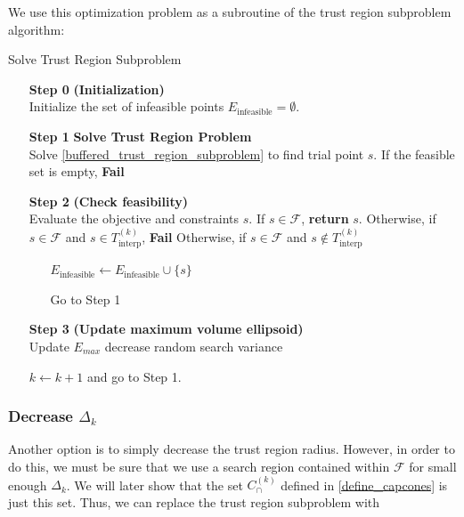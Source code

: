 \documentclass{article}
\theoremstyle{case}
\newcommand{\dk}{\Delta_k}
\newcommand{\sampletrk}{{T_{\text{interp}}^{(k)}}}
\newcommand{\feasible}{{\mathcal F}}
\newcommand{\trsinfset}{{E_\text{infeasible}}}
\newcommand{\capcones}{{C^{(k)}_{\cap}}}
\begin{document}
We use this optimization problem as a subroutine of the trust region subproblem algorithm:

\begin{algorithm}[H]
    \caption{Solve Trust Region Subproblem}
    \label{linear_cut_trust_region_subproblem}
    \begin{itemize}
        \item[\textbf{Step 0}] \textbf{(Initialization)} \\
	    Initialize the set of infeasible points $\trsinfset = \emptyset$.
        
        \item[\textbf{Step 1}] \textbf{Solve Trust Region Problem} \\
	    Solve \cref{buffered_trust_region_subproblem} to find trial point $s$.
	    If the feasible set is empty, \textbf{Fail}
        
        \item[\textbf{Step 2}] \textbf{(Check feasibility)} \\
            Evaluate the objective and constraints $s$.
            If $s\in\feasible$, \textbf{return} $s$.
            Otherwise, if $s\in\feasible$ and $s \in \sampletrk$, \textbf{Fail}
	    Otherwise, if $s\in\feasible$ and $s \not \in \sampletrk$ \begin{itemize}
	    	\item[] $\trsinfset \gets \trsinfset \cup \{s\}$
	    	\item[] Go to Step 1
	    \end{itemize}
            
        \item[\textbf{Step 3}] \textbf{(Update maximum volume ellipsoid)} \\
	    Update $E_{max}$
	    decrease random search variance
            
        $k \gets k+1$ and go to Step 1.
    \end{itemize}
\end{algorithm}




\subsubsection{Decrease $\dk$}

Another option is to simply decrease the trust region radius.
However, in order to do this, we must be sure that we use a search region contained within $\feasible$ for small enough $\dk$.
We will later show that the set $\capcones$ defined in \cref{define_capcones} is just this set.
Thus, we can replace the trust region subproblem with
\end{document}
